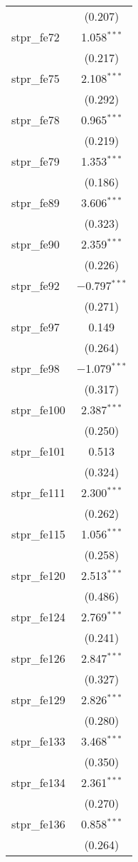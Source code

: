 \begin{table}[!htbp]
\begin{tabular}{@{\extracolsep{5pt}}lc}
  & (0.207) \\ 
  stpr\_fe72 & 1.058$^{***}$ \\ 
  & (0.217) \\ 
  stpr\_fe75 & 2.108$^{***}$ \\ 
  & (0.292) \\ 
  stpr\_fe78 & 0.965$^{***}$ \\ 
  & (0.219) \\ 
  stpr\_fe79 & 1.353$^{***}$ \\ 
  & (0.186) \\ 
  stpr\_fe89 & 3.606$^{***}$ \\ 
  & (0.323) \\ 
  stpr\_fe90 & 2.359$^{***}$ \\ 
  & (0.226) \\ 
  stpr\_fe92 & $-$0.797$^{***}$ \\ 
  & (0.271) \\ 
  stpr\_fe97 & 0.149 \\ 
  & (0.264) \\ 
  stpr\_fe98 & $-$1.079$^{***}$ \\ 
  & (0.317) \\ 
  stpr\_fe100 & 2.387$^{***}$ \\ 
  & (0.250) \\ 
  stpr\_fe101 & 0.513 \\ 
  & (0.324) \\ 
  stpr\_fe111 & 2.300$^{***}$ \\ 
  & (0.262) \\ 
  stpr\_fe115 & 1.056$^{***}$ \\ 
  & (0.258) \\ 
  stpr\_fe120 & 2.513$^{***}$ \\ 
  & (0.486) \\ 
  stpr\_fe124 & 2.769$^{***}$ \\ 
  & (0.241) \\ 
  stpr\_fe126 & 2.847$^{***}$ \\ 
  & (0.327) \\ 
  stpr\_fe129 & 2.826$^{***}$ \\ 
  & (0.280) \\ 
  stpr\_fe133 & 3.468$^{***}$ \\ 
  & (0.350) \\ 
  stpr\_fe134 & 2.361$^{***}$ \\ 
  & (0.270) \\ 
  stpr\_fe136 & 0.858$^{***}$ \\ 
  & (0.264) \\ 

\end{tabular}
\end{table}
